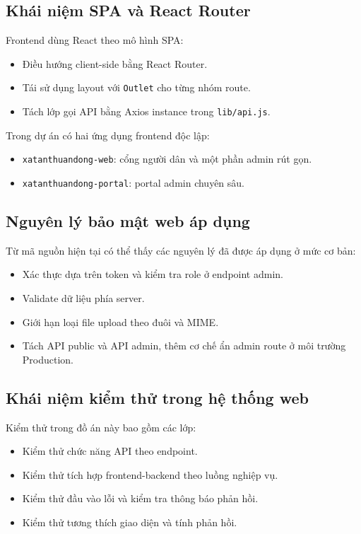 \documentclass[12pt,a4paper]{article}
\begin{document}
\subsection{Khái niệm SPA và React Router}
Frontend dùng React theo mô hình SPA:
\begin{itemize}[leftmargin=1.1cm]
  \item Điều hướng client-side bằng React Router.
  \item Tái sử dụng layout với \texttt{Outlet} cho từng nhóm route.
  \item Tách lớp gọi API bằng Axios instance trong \texttt{lib/api.js}.
\end{itemize}

Trong dự án có hai ứng dụng frontend độc lập:
\begin{itemize}[leftmargin=1.1cm]
  \item \texttt{xatanthuandong-web}: cổng người dân và một phần admin rút gọn.
  \item \texttt{xatanthuandong-portal}: portal admin chuyên sâu.
\end{itemize}

\subsection{Nguyên lý bảo mật web áp dụng}
Từ mã nguồn hiện tại có thể thấy các nguyên lý đã được áp dụng ở mức cơ bản:
\begin{itemize}[leftmargin=1.1cm]
  \item Xác thực dựa trên token và kiểm tra role ở endpoint admin.
  \item Validate dữ liệu phía server.
  \item Giới hạn loại file upload theo đuôi và MIME.
  \item Tách API public và API admin, thêm cơ chế ẩn admin route ở môi trường Production.
\end{itemize}

\subsection{Khái niệm kiểm thử trong hệ thống web}
Kiểm thử trong đồ án này bao gồm các lớp:
\begin{itemize}[leftmargin=1.1cm]
  \item Kiểm thử chức năng API theo endpoint.
  \item Kiểm thử tích hợp frontend-backend theo luồng nghiệp vụ.
  \item Kiểm thử đầu vào lỗi và kiểm tra thông báo phản hồi.
  \item Kiểm thử tương thích giao diện và tính phản hồi.
\end{itemize}
\end{document}
